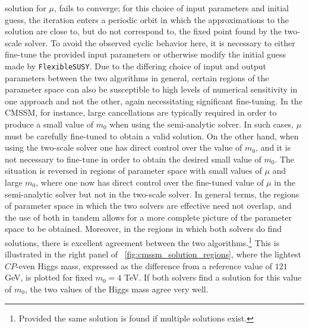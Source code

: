 \documentclass[final,3p,11pt,pdflatex]{elsarticle}
\makeatletter
\newcommand{\fs}{\texttt{FlexibleSUSY}\@\xspace}
\newcommand{\figref}[1]{\figurename~\ref{#1}}
\newcommand{\CP}{\ensuremath{CP}\xspace}
\newcommand{\mzero}{\ensuremath{m_0}\xspace}
\makeatother
\begin{document}
solution for $\mu$, fails to converge; for this choice of input parameters
and initial guess, the iteration enters a periodic orbit in which the
approximations to the solution are close to, but do not correspond to, the
fixed point found by the two-scale solver.  To avoid the observed cyclic
behavior here, it is necessary to either fine-tune the provided input
parameters or otherwise modify the initial guess made by \fs.  Due to the
differing choice of input and output parameters between the two algorithms
in general, certain regions of the parameter space can also be susceptible to
high levels of numerical sensitivity in one approach and not the other,
again necessitating significant fine-tuning.  In the CMSSM, for instance,
large cancellations are typically required in
order to produce a small value of $m_0$ when using the semi-analytic solver.
In such cases, $\mu$ must be carefully fine-tuned to obtain a valid solution.
On the other hand, when using the two-scale solver one has direct control over
the value of $m_0$, and it is not necessary to fine-tune in order to obtain
the desired small value of $m_0$.  The situation is reversed in regions of
parameter space with small values of $\mu$ and large $m_0$, where one now
has direct control over the fine-tuned value of $\mu$ in the semi-analytic
solver but not in the two-scale solver.  In general terms, the regions of
parameter space in which the two solvers are effective need not overlap, and
the use of both in tandem allows for a more complete picture of the parameter
space to be obtained.  Moreover, in the regions in which both solvers do find
solutions, there is excellent agreement between the two algorithms.\footnote{
  Provided the same solution is found if multiple solutions exist.}  This is
illustrated in the right panel of \figref{fig:cmssm_solution_regions}, where
the lightest \CP-even Higgs mass, expressed as the difference from a reference
value of $121$ GeV, is plotted for fixed $\mzero = 4$ TeV\@.  If both solvers
find a solution for this value of $\mzero$, the two values of the Higgs mass
agree very well.
\end{document}
